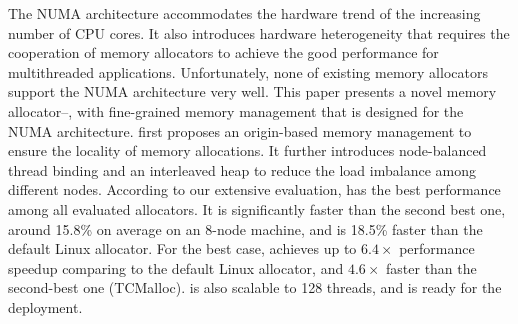 The NUMA architecture accommodates the hardware trend of the increasing number of CPU cores. It also introduces hardware heterogeneity that requires the cooperation of memory allocators to achieve the good performance for multithreaded applications. Unfortunately, none of existing memory allocators support the NUMA architecture very well. 
This paper presents a novel memory allocator--\NM{}, with fine-grained memory management that is designed for the NUMA architecture. \NM{} first proposes an origin-based memory management to ensure the locality of memory allocations. It further introduces node-balanced thread binding and an interleaved heap to reduce the load imbalance among different nodes. 
According to our extensive evaluation, \NM{} has the best performance among all evaluated allocators. It is significantly faster than the second best one, around 15.8\% on average on an 8-node machine, and is 18.5\% faster than the default Linux allocator. For the best case, \NM{} achieves up to $6.4\times$ performance speedup comparing to the default Linux allocator, and $4.6\times$ faster than the second-best one (TCMalloc). \NM{} is also scalable to 128 threads, and is ready for the deployment.